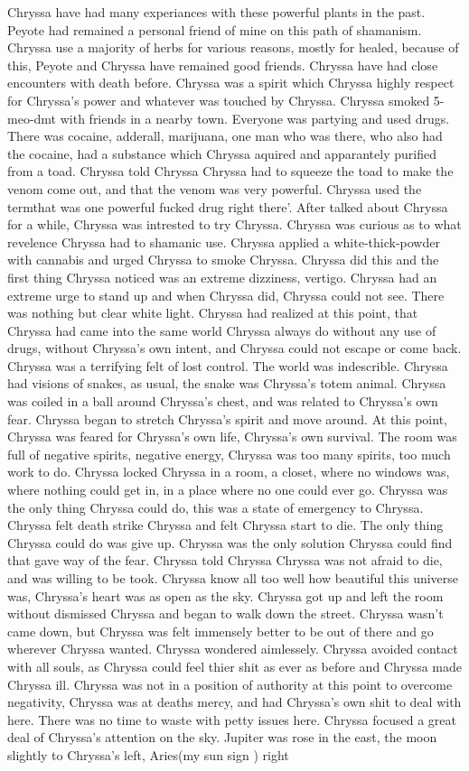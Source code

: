 \documentclass[12pt]{book}
\begin{document}
Chryssa have had many experiances with these powerful plants in the past. Peyote had remained a personal friend of mine on this path of shamanism. Chryssa use a majority of herbs for various reasons, mostly for healed, because of this, Peyote and Chryssa have remained good friends. Chryssa have had close encounters with death before. Chryssa was a spirit which Chryssa highly respect for Chryssa's power and whatever was touched by Chryssa. Chryssa smoked 5-meo-dmt with friends in a nearby town. Everyone was partying and used drugs. There was cocaine, adderall, marijuana, one man who was there, who also had the cocaine, had a substance which Chryssa aquired and apparantely purified from a toad. Chryssa told Chryssa Chryssa had to squeeze the toad to make the venom come out, and that the venom was very powerful. Chryssa used the termthat was one powerful fucked drug right there'. After talked about Chryssa for a while, Chryssa was intrested to try Chryssa. Chryssa was curious as to what revelence Chryssa had to shamanic use. Chryssa applied a white-thick-powder with cannabis and urged Chryssa to smoke Chryssa. Chryssa did this and the first thing Chryssa noticed was an extreme dizziness, vertigo. Chryssa had an extreme urge to stand up and when Chryssa did, Chryssa could not see. There was nothing but clear white light. Chryssa had realized at this point, that Chryssa had came into the same world Chryssa always do without any use of drugs, without Chryssa's own intent, and Chryssa could not escape or come back. Chryssa was a terrifying felt of lost control. The world was indescrible. Chryssa had visions of snakes, as usual, the snake was Chryssa's totem animal. Chryssa was coiled in a ball around Chryssa's chest, and was related to Chryssa's own fear. Chryssa began to stretch Chryssa's spirit and move around. At this point, Chryssa was feared for Chryssa's own life, Chryssa's own survival. The room was full of negative spirits, negative energy, Chryssa was too many spirits, too much work to do. Chryssa locked Chryssa in a room, a closet, where no windows was, where nothing could get in, in a place where no one could ever go. Chryssa was the only thing Chryssa could do, this was a state of emergency to Chryssa. Chryssa felt death strike Chryssa and felt Chryssa start to die. The only thing Chryssa could do was give up. Chryssa was the only solution Chryssa could find that gave way of the fear. Chryssa told Chryssa Chryssa was not afraid to die, and was willing to be took. Chryssa know all too well how beautiful this universe was, Chryssa's heart was as open as the sky. Chryssa got up and left the room without dismissed Chryssa and began to walk down the street. Chryssa wasn't came down, but Chryssa was felt immensely better to be out of there and go wherever Chryssa wanted. Chryssa wondered aimlessely. Chryssa avoided contact with all souls, as Chryssa could feel thier shit as ever as before and Chryssa made Chryssa ill. Chryssa was not in a position of authority at this point to overcome negativity, Chryssa was at deaths mercy, and had Chryssa's own shit to deal with here. There was no time to waste with petty issues here. Chryssa focused a great deal of Chryssa's attention on the sky. Jupiter was rose in the east, the moon slightly to Chryssa's left, Aries(my sun sign ) right 
\end{document}
